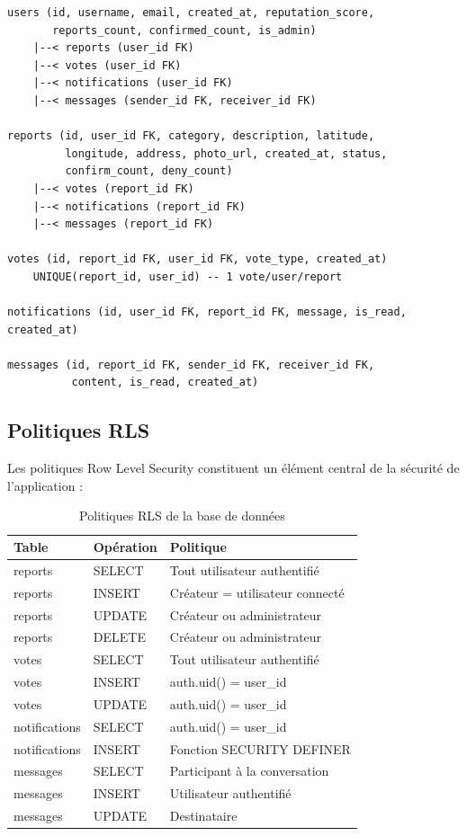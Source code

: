 \documentclass[12pt,a4paper]{report}
\begin{document}
\begin{lstlisting}[style=codeblock, caption=Schéma relationnel de la base de donnees]
users (id, username, email, created_at, reputation_score,
       reports_count, confirmed_count, is_admin)
    |--< reports (user_id FK)
    |--< votes (user_id FK)
    |--< notifications (user_id FK)
    |--< messages (sender_id FK, receiver_id FK)

reports (id, user_id FK, category, description, latitude,
         longitude, address, photo_url, created_at, status,
         confirm_count, deny_count)
    |--< votes (report_id FK)
    |--< notifications (report_id FK)
    |--< messages (report_id FK)

votes (id, report_id FK, user_id FK, vote_type, created_at)
    UNIQUE(report_id, user_id) -- 1 vote/user/report

notifications (id, user_id FK, report_id FK, message, is_read, created_at)

messages (id, report_id FK, sender_id FK, receiver_id FK,
          content, is_read, created_at)
\end{lstlisting}

\subsection{Politiques RLS}

Les politiques Row Level Security constituent un élément central de la sécurité de l'application :

{\small
\begin{longtable}{|p{2.5cm}|p{2.5cm}|p{9.5cm}|}
    \caption{Politiques RLS de la base de données}
    \label{tab:rls}\\
    \hline
    \rowcolor{supnumgreen!20}
    \textbf{Table} & \textbf{Opération} & \textbf{Politique} \\
    \hline
    \endhead
    \hline
    \endfoot
    reports & SELECT & Tout utilisateur authentifié \\
    \hline
    reports & INSERT & Créateur = utilisateur connecté \\
    \hline
    reports & UPDATE & Créateur ou administrateur \\
    \hline
    reports & DELETE & Créateur ou administrateur \\
    \hline
    votes & SELECT & Tout utilisateur authentifié \\
    \hline
    votes & INSERT & auth.uid() = user\_id \\
    \hline
    votes & UPDATE & auth.uid() = user\_id \\
    \hline
    notifications & SELECT & auth.uid() = user\_id \\
    \hline
    notifications & INSERT & Fonction SECURITY DEFINER \\
    \hline
    messages & SELECT & Participant à la conversation \\
    \hline
    messages & INSERT & Utilisateur authentifié \\
    \hline
    messages & UPDATE & Destinataire \\
    \hline
\end{longtable}
}
\end{document}
